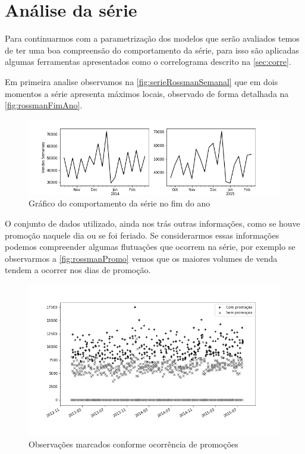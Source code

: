 \documentclass[
    12pt,
    oneside,
    a4paper,
    english,
    brazil
]{abntex2}
\begin{document}
\section{Análise da série}

Para continuarmos com a parametrização dos modelos que serão avaliados temos de
ter uma boa compreensão do comportamento da série, para isso são aplicadas
algumas ferramentas apresentados como o correlograma descrito na
\autoref{sec:corre}.

Em primeira analise observamos na \autoref{fig:serieRossmanSemanal} que em dois
momentos a série apresenta máximos locais, observado de forma detalhada na
\autoref{fig:rossmanFimAno}.

\begin{figure}
    \centering
    \caption{Gráfico do comportamento da série no fim do
        ano}\label{fig:rossmanFimAno}
    \includegraphics[width=.8\textwidth]{images/graficoRossmanFimAno.png}
\end{figure}

O conjunto de dados utilizado, ainda nos trás outras informações, como se houve
promoção naquele dia ou se foi feriado. Se considerarmos essas informações
podemos compreender algumas flutuações que ocorrem na série, por exemplo se
observarmos a \autoref{fig:rossmanPromo} vemos que os maiores volumes de venda
tendem a ocorrer nos dias de promoção.

\begin{figure}
    \centering
    \caption{Observações marcados conforme ocorrência de promoções}
    \includegraphics[width=.7\textwidth]{images/graficoRossmanPromo.png}
\end{figure}
\end{document}
